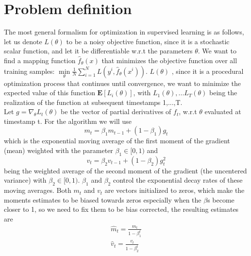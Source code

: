 \documentclass[10pt,a4paper]{article}
\begin{document}
\section{Problem definition}

The most general formalism for optimization in supervised learning is as follows, let us denote $L(\theta)$ to be a noisy objective function, since it is a stochastic scalar function, and let it be differentiable w.r.t the parameters $\theta$. 
We want to find a mapping function $\hat{f}_\theta (x)$ that minimizes the objective function over all training samples:
$\min \limits_{\theta} \frac{1}{N}\sum_{i=1}^{N} L(y^i, \hat{f}_\theta (x^i))$. $L(\theta)$ 
, since it is a procedural optimization process that continues until convergence, we want to minimize the expected value of this function $\mathbf{E}[L_i(\theta)]$, with $L_1(\theta), ...L_T(\theta)$ being the realization of the function at subsequent timestamps 1,...,T.\\
Let $g=\nabla_\theta L_t(\theta)$ be the vector of partial derivatives of $f_t$, w.r.t $\theta$ evaluated at timestamp t. For the algorithm we will use 
\begin{equation*}
    m_t=\beta_1m_{t-1}+(1-\beta_1)g_t
\end{equation*}
which is the exponential moving average of the first moment of the gradient (mean) weighted with the parameter $\beta_1\in[0,1)$ and 
\begin{equation*}
    v_t=\beta_2v_{t-1}+(1-\beta_2)g^2_t
\end{equation*}
being the weighted average of the second moment of the gradient (the uncentered variance) with $\beta_2\in[0,1)$. $\beta_1$ and $\beta_2$ control the exponential decay rates of these moving
averages.
Both $m_t$ and $v_t$ are vectors initialized to zeros, which make the moments estimates to be biased towards zeros especially when the $\beta$s become closer to 1, so we need to fix them to be bias corrected, the resulting estimates are 
\begin{equation*}
    \begin{split}
    \hat{m}_t=\frac{m_t}{1-\beta_1^t} \\ 
    \hat{v}_t=\frac{v_t}{1-\beta_2^t}
    \end{split}
\end{equation*}
\end{document}

